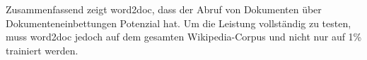 \documentclass[english, ngerman]{KITreprt}
\begin{document}
Zusammenfassend zeigt word2doc, dass der Abruf von Dokumenten über Dokumenteneinbettungen Potenzial hat. Um die
Leistung vollständig zu testen, muss word2doc jedoch auf dem gesamten Wikipedia-Corpus und nicht nur auf 1\%
trainiert werden.
\vspace*{\fill}
\cleardoublepage

\tableofcontents
\setcounter{page}{1}











\end{document}

